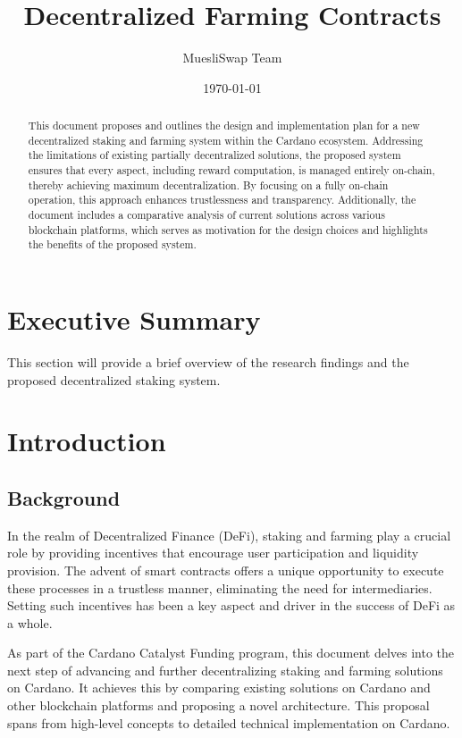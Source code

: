 \documentclass[12pt,parskip=full, tikz]{article}
\begin{document}
\title{Decentralized Farming Contracts}
\author{MuesliSwap Team}
\date{\today}
\maketitle

\begin{abstract} \noindent
This document proposes and outlines the design and implementation plan for a new decentralized staking and farming system within the Cardano ecosystem. Addressing the limitations of existing partially decentralized solutions, the proposed system ensures that every aspect, including reward computation, is managed entirely on-chain, thereby achieving maximum decentralization. By focusing on a fully on-chain operation, this approach enhances trustlessness and transparency. Additionally, the document includes a comparative analysis of current solutions across various blockchain platforms, which serves as motivation for the design choices and highlights the benefits of the proposed system.
\end{abstract}
\newpage 

\tableofcontents
\newpage

\section*{Executive Summary}
This section will provide a brief overview of the research findings and the proposed decentralized staking system.

\section{Introduction}

\subsection{Background}

In the realm of Decentralized Finance (DeFi), staking and farming play a crucial role by providing incentives that encourage user participation and liquidity provision. The advent of smart contracts offers a unique opportunity to execute these processes in a trustless manner, eliminating the need for intermediaries. Setting such incentives has been a key aspect and driver in the success of DeFi as a whole. 

As part of the Cardano Catalyst Funding program, this document delves into the next step of advancing and further decentralizing staking and farming solutions on Cardano. It achieves this by comparing existing solutions on Cardano and other blockchain platforms and proposing a novel architecture. This proposal spans from high-level concepts to detailed technical implementation on Cardano.
\end{document}

